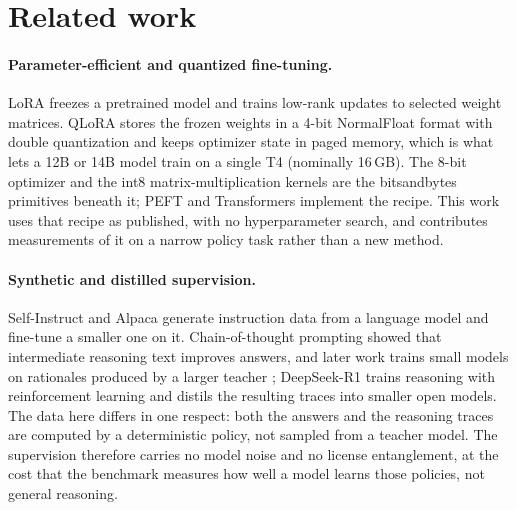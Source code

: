 \section{Related work}\label{sec:related}

\paragraph{Parameter-efficient and quantized fine-tuning.}
LoRA \citep{hu2022lora} freezes a pretrained model and trains low-rank updates to selected weight matrices. QLoRA \citep{dettmers2023qlora} stores the frozen weights in a 4-bit NormalFloat format with double quantization and keeps optimizer state in paged memory, which is what lets a 12B or 14B model train on a single T4 (nominally 16\,GB). The 8-bit optimizer \citep{dettmers2022optimizers} and the int8 matrix-multiplication kernels \citep{dettmers2022int8} are the bitsandbytes primitives beneath it; PEFT \citep{mangrulkar2022peft} and Transformers \citep{wolf2020transformers} implement the recipe. This work uses that recipe as published, with no hyperparameter search, and contributes measurements of it on a narrow policy task rather than a new method.

\paragraph{Synthetic and distilled supervision.}
Self-Instruct \citep{wang2023selfinstruct} and Alpaca \citep{taori2023alpaca} generate instruction data from a language model and fine-tune a smaller one on it. Chain-of-thought prompting \citep{wei2022cot} showed that intermediate reasoning text improves answers, and later work trains small models on rationales produced by a larger teacher \citep{ho2023teachers,hsieh2023distilling}; DeepSeek-R1 \citep{guo2025deepseekr1} trains reasoning with reinforcement learning and distils the resulting traces into smaller open models. The data here differs in one respect: both the answers and the reasoning traces are computed by a deterministic policy, not sampled from a teacher model. The supervision therefore carries no model noise and no license entanglement, at the cost that the benchmark measures how well a model learns those policies, not general reasoning.

